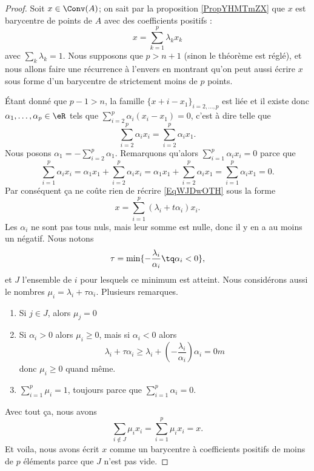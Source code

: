 \begin{proof}
    Soit \( x\in\Conv(A)\); on sait par la proposition \ref{PropYHMTmZX} que \( x\) est barycentre de points de \( A\) avec des coefficients positifs :
    \begin{equation}    \label{EqWJDwOTH}
        x=\sum_{k=1}^p\lambda_kx_k
    \end{equation}
    avec \( \sum_k\lambda_k=1\). Nous supposons que \( p>n+1\) (sinon le théorème est réglé), et nous allons faire une récurrence à l'envers en montrant qu'on peut aussi écrire \( x\) sous forme d'un barycentre de strictement moins de \( p\) points.
    
    Étant donné que \( p-1>n\), la famille \( \{ x+i-x_1 \}_{i=2,\ldots, p}\) est liée et il existe donc \( \alpha_1,\ldots, \alpha_p\in \eR\) tels que \( \sum_{i=2}^p\alpha_i(x_i-x_1)=0\), c'est à dire telle que
    \begin{equation}
        \sum_{i=2}^p\alpha_ix_i=\sum_{i=2}^p\alpha_ix_1.
    \end{equation}
    Nous posons \( \alpha_1=-\sum_{i=2}^p\alpha_1\). Remarquons qu'alors \( \sum_{i=1}^p\alpha_ix_i=0\) parce que
    \begin{equation}
        \sum_{i=1}^p\alpha_ix_i=\alpha_1x_1+\sum_{i=2}^p\alpha_ix_i=\alpha_1x_1+\sum_{i=2}^p\alpha_ix_1=\sum_{i=1}^p\alpha_ix_1=0.
    \end{equation}
    Par conséquent ça ne coûte rien de récrire \eqref{EqWJDwOTH} sous la forme
    \begin{equation}
        x=\sum_{i=1}^p(\lambda_i+t\alpha_i)x_i.
    \end{equation}
    Les \( \alpha_i\) ne sont pas tous nuls, mais leur somme est nulle, donc il y en a au moins un négatif. Nous notons
    \begin{equation}
        \tau=\min\{ -\frac{ \lambda_i }{ \alpha_i }\tq \alpha_i<0 \},
    \end{equation}
    et \( J\) l'ensemble de \( i\) pour lesquels ce minimum est atteint. Nous considérons aussi le nombres \( \mu_i=\lambda_i+\tau\alpha_i\). Plusieurs remarques. 
    \begin{enumerate}
        \item
            Si \( j\in J\), alors \( \mu_j=0\)
        \item
            Si \( \alpha_i>0\) alors \( \mu_i\geq 0\), mais si \( \alpha_i<0\) alors
            \begin{equation}
                \lambda_i+\tau\alpha_i\geq \lambda_i+(-\frac{ \lambda_i }{ \alpha_i })\alpha_i=0m
            \end{equation}
            donc \( \mu_i\geq 0\) quand même.
        \item
            \( \sum_{i=1}^p\mu_i=1\), toujours parce que \( \sum_{i=1}^p\alpha_i=0\).
    \end{enumerate}
    Avec tout ça, nous avons
    \begin{equation}
        \sum_{i\notin J}\mu_ix_i=\sum_{i=1}^p\mu_ix_i=x.
    \end{equation}
    Et voila, nous avons écrit \( x\) comme un barycentre à coefficients positifs de moins de \( p\) éléments parce que \( J\) n'est pas vide.
\end{proof}

